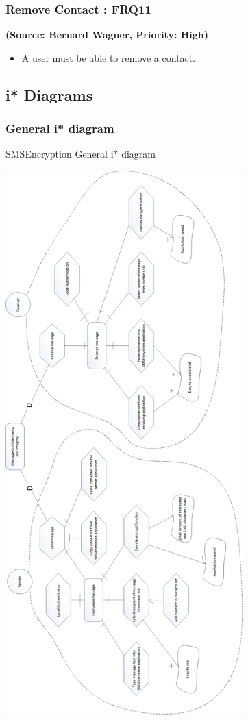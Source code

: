 \subsubsection{Remove Contact : FRQ11}
\textbf{(Source: Bernard Wagner, Priority: High)}
\begin{itemize}
\item A user must be able to remove a contact.
\end{itemize}


\subsection{i* Diagrams}
\subsubsection{General i* diagram}
SMSEncryption General i* diagram

\begin{center}
 \includegraphics[height=21cm]{diagrams/IStarDiagrams/SMSEncryptionIStarDiagram.png}
\end{center}

